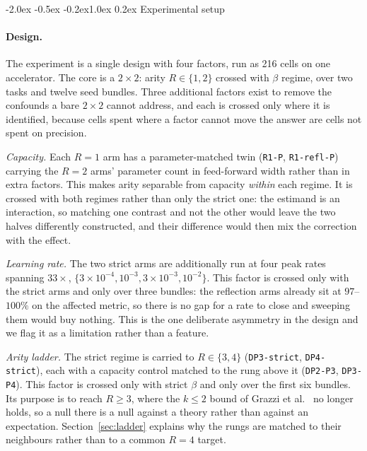 \documentclass[10pt,twocolumn]{article}
\makeatletter
\renewcommand\section{\@startsection{section}{1}{\z@}%
  {-2.0ex \@plus -0.5ex \@minus -0.2ex}{1.0ex \@plus 0.2ex}%
  {\normalfont\large\bfseries}}
\makeatother
\begin{document}
\section{Experimental setup}
\label{sec:setup}

\paragraph{Design.}
The experiment is a single design with four factors, run as 216 cells on one
accelerator. The core is a $2\times2$: arity $R \in \{1,2\}$ crossed with $\beta$
regime, over two tasks and twelve seed bundles. Three additional factors exist to
remove the confounds a bare $2\times2$ cannot address, and each is crossed only
where it is identified, because cells spent where a factor cannot move the answer
are cells not spent on precision.

\emph{Capacity.} Each $R{=}1$ arm has a parameter-matched twin
(\texttt{R1-P}, \texttt{R1-refl-P}) carrying the $R{=}2$ arms' parameter count
in feed-forward width rather than in extra factors. This makes arity separable
from capacity \emph{within} each regime. It is crossed with both regimes rather
than only the strict one: the estimand is an interaction, so matching one
contrast and not the other would leave the two halves differently constructed,
and their difference would then mix the correction with the effect.

\emph{Learning rate.} The two strict arms are additionally run at four peak
rates spanning $33\times$, $\{3{\times}10^{-4}, 10^{-3}, 3{\times}10^{-3},
10^{-2}\}$. This factor is crossed only with the strict arms and only over three
bundles: the reflection arms already sit at $97$--$100\%$ on the affected metric,
so there is no gap for a rate to close and sweeping them would buy nothing. This
is the one deliberate asymmetry in the design and we flag it as a limitation
rather than a feature.

\emph{Arity ladder.} The strict regime is carried to $R\in\{3,4\}$
(\texttt{DP3-strict}, \texttt{DP4-strict}), each with a capacity control matched
to the rung above it (\texttt{DP2-P3}, \texttt{DP3-P4}). This factor is crossed
only with strict $\beta$ and only over the first six bundles. Its purpose is to
reach $R\ge3$, where the $k\le2$ bound of Grazzi et al.~\cite{grazzi2025} no longer holds,
so a null there is a null against a theory rather than against an expectation.
Section~\ref{sec:ladder} explains why the rungs are matched to their neighbours
rather than to a common $R{=}4$ target.
\end{document}
